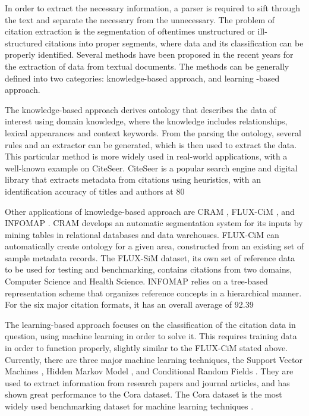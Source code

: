 		In order to extract the necessary information, a parser is required to sift through the text and separate the necessary from the unnecessary. The problem of citation extraction is the segmentation of oftentimes unstructured or ill-structured citations into proper segments, where data and its classification can be properly identified. Several methods have been proposed in the recent years for the extraction of data from textual documents. The methods can be generally defined into two categories: knowledge-based approach, and learning -based approach. \cite{bibpro}

	The knowledge-based approach derives ontology that describes the data of interest using domain knowledge, where the knowledge includes relationships, lexical appearances and context keywords. From the parsing the ontology, several rules and an extractor can be generated, which is then used to extract the data. This particular method is more widely used in real-world applications, with a well-known example on CiteSeer. CiteSeer is a popular search engine and digital library that extracts metadata from citations using heuristics, with an identification accuracy of titles and authors at 80%

	Other applications of knowledge-based approach are CRAM \cite{cram}, FLUX-CiM \cite{flux}, and INFOMAP \cite{infmap}. CRAM develops an automatic segmentation system for its inputs by mining tables in relational databases and data warehouses. FLUX-CiM can automatically create ontology for a given area, constructed from an existing set of sample metadata records.  The FLUX-SiM dataset, its own set of reference data to be used for testing and benchmarking, contains citations from two domains, Computer Science and Health Science. INFOMAP relies on a tree-based representation scheme that organizes reference concepts in a hierarchical manner. For the six major citation formats, it has an overall average of 92.39%

	The learning-based approach focuses on the classification of the citation data in question, using machine learning in order to solve it. This requires training data in order to function properly, slightly similar to the FLUX-CiM stated above. Currently, there are three major machine learning techniques, the Support Vector Machines \cite{svm}, Hidden Markov Model \cite{markov}, and Conditional Random Fields \cite{crf}.  They are used to extract information from research papers and journal articles, and has shown great performance to the Cora dataset. The Cora dataset is the most widely used benchmarking dataset for machine learning techniques \cite{cora}. 

